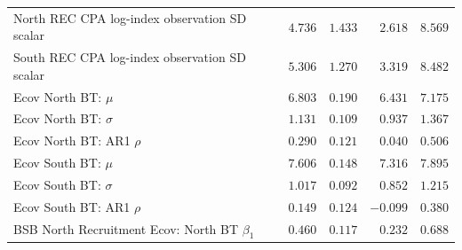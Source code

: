 \documentclass[
]{article}
\begin{document}
\begin{landscape}
\begin{longtable}[t]{lrrrr}
North REC CPA log-index observation SD scalar & $4.736$ & $1.433$ & $2.618$ & $8.569$\\
South REC CPA log-index observation SD scalar & $5.306$ & $1.270$ & $3.319$ & $8.482$\\
Ecov North BT: $\mu$ & $6.803$ & $0.190$ & $6.431$ & $7.175$\\
Ecov North BT: $\sigma$ & $1.131$ & $0.109$ & $0.937$ & $1.367$\\
\addlinespace
Ecov North BT: AR1 $\rho$ & $0.290$ & $0.121$ & $0.040$ & $0.506$\\
Ecov South BT: $\mu$ & $7.606$ & $0.148$ & $7.316$ & $7.895$\\
Ecov South BT: $\sigma$ & $1.017$ & $0.092$ & $0.852$ & $1.215$\\
Ecov South BT: AR1 $\rho$ & $0.149$ & $0.124$ & $-0.099$ & $0.380$\\
BSB North Recruitment Ecov: North BT $\beta_1$ & $0.460$ & $0.117$ & $0.232$ & $0.688$\\*
\end{longtable}
\end{landscape}

\clearpage
\end{document}
